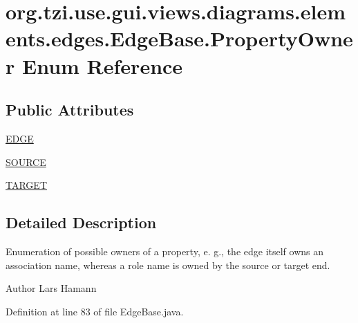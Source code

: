 \hypertarget{enumorg_1_1tzi_1_1use_1_1gui_1_1views_1_1diagrams_1_1elements_1_1edges_1_1_edge_base_1_1_property_owner}{\section{org.\-tzi.\-use.\-gui.\-views.\-diagrams.\-elements.\-edges.\-Edge\-Base.\-Property\-Owner Enum Reference}
\label{enumorg_1_1tzi_1_1use_1_1gui_1_1views_1_1diagrams_1_1elements_1_1edges_1_1_edge_base_1_1_property_owner}
}
\subsection*{Public Attributes}
\begin{DoxyCompactItemize}
\item 
\hyperlink{enumorg_1_1tzi_1_1use_1_1gui_1_1views_1_1diagrams_1_1elements_1_1edges_1_1_edge_base_1_1_property_owner_a831a392ad65d8636e1fcf9d4d134fce5}{E\-D\-G\-E}
\item 
\hyperlink{enumorg_1_1tzi_1_1use_1_1gui_1_1views_1_1diagrams_1_1elements_1_1edges_1_1_edge_base_1_1_property_owner_a2b8a93534e19bbf8ff21694ab930e840}{S\-O\-U\-R\-C\-E}
\item 
\hyperlink{enumorg_1_1tzi_1_1use_1_1gui_1_1views_1_1diagrams_1_1elements_1_1edges_1_1_edge_base_1_1_property_owner_a114d5b6e91ae26337782d08ecdd12088}{T\-A\-R\-G\-E\-T}
\end{DoxyCompactItemize}


\subsection{Detailed Description}
Enumeration of possible owners of a property, e. g., the edge itself owns an association name, whereas a role name is owned by the source or target end.

\begin{DoxyAuthor}{Author}
Lars Hamann 
\end{DoxyAuthor}


Definition at line 83 of file Edge\-Base.\-java.



